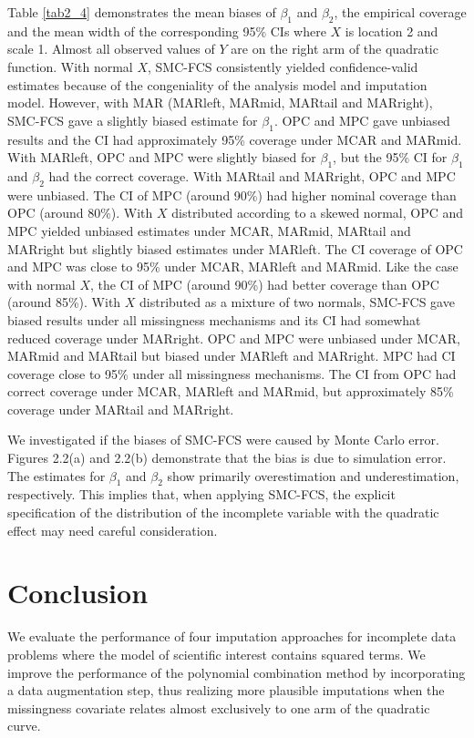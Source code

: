 	Table \ref{tab2_4} demonstrates the mean biases of $\beta_{1}$ and $\beta_{2}$, the empirical coverage and the mean width of the corresponding 95\% CIs where $X$ is location 2 and scale 1. Almost all observed values of $Y$ are on the right arm of the quadratic function. With normal $X$, SMC-FCS consistently yielded confidence-valid estimates because of the congeniality of the analysis model and imputation model. However, with MAR (MARleft, MARmid, MARtail and MARright), SMC-FCS gave a slightly biased estimate for $\beta_{1}$. OPC and MPC gave unbiased results and the CI had approximately 95\% coverage under MCAR and MARmid. With MARleft, OPC and MPC were slightly biased for $\beta_{1}$, but the 95\% CI for $\beta_{1}$ and $\beta_{2}$ had the correct coverage. With MARtail and MARright, OPC and MPC were unbiased. The CI of MPC (around 90\%) had higher nominal coverage than OPC (around 80\%). With $X$ distributed according to a skewed normal, OPC and MPC yielded unbiased estimates under MCAR, MARmid, MARtail and MARright but slightly biased estimates under MARleft. The CI coverage of OPC and MPC was close to 95\% under MCAR, MARleft and MARmid. Like the case with normal $X$, the CI of MPC (around 90\%) had better coverage than OPC (around 85\%). With $X$ distributed as a mixture of two normals, SMC-FCS gave biased results under all missingness mechanisms and its CI had somewhat reduced coverage under MARright. OPC and MPC were unbiased under MCAR, MARmid and MARtail but biased under MARleft and MARright. MPC had CI coverage close to 95\% under all missingness mechanisms. The CI from OPC had correct coverage under MCAR, MARleft and MARmid, but approximately 85\% coverage under MARtail and MARright.         
	
	
	We investigated if the biases of SMC-FCS were caused by Monte Carlo error. Figures 2.2(a) and 2.2(b) demonstrate that the bias is due to simulation error. The estimates for $\beta_{1}$ and $\beta_{2}$ show primarily overestimation and underestimation, respectively. This implies that, when applying SMC-FCS, the explicit specification of the distribution of the incomplete variable with the quadratic effect may need careful consideration.
	
	
	
	\section{Conclusion}
	We evaluate the performance of four imputation approaches for incomplete data problems where the model of scientific interest contains squared terms. We improve the performance of the polynomial combination method by incorporating a data augmentation step, thus realizing more plausible imputations when the missingness covariate relates almost exclusively to one arm of the quadratic curve.
	
